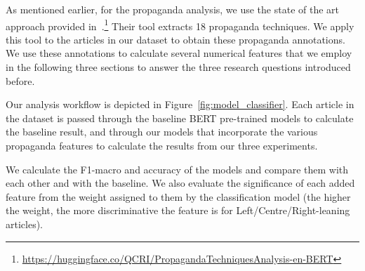 As mentioned earlier, for the propaganda analysis, we use the state of the art approach provided in~\citet{da2019fine}.\footnote{\url{https://huggingface.co/QCRI/PropagandaTechniquesAnalysis-en-BERT}} Their tool extracts 18 propaganda techniques. We apply this tool to the articles in our dataset to obtain these propaganda annotations. 
We use these annotations to calculate several numerical features that we employ in the following three sections to answer the three research questions introduced before.



Our analysis workflow %
is depicted in Figure~\ref{fig:model_classifier}. Each article in the dataset is passed through the baseline BERT pre-trained models to calculate the baseline result, and through our models that incorporate the various propaganda features to calculate the results from our three experiments. %



We calculate the F1-macro and accuracy of the models and compare them with each other and with the baseline. %
We also evaluate the significance of each added feature from the weight assigned to them %
by the classification model (the higher the weight, the more discriminative the feature is for Left/Centre/Right-leaning articles). %

